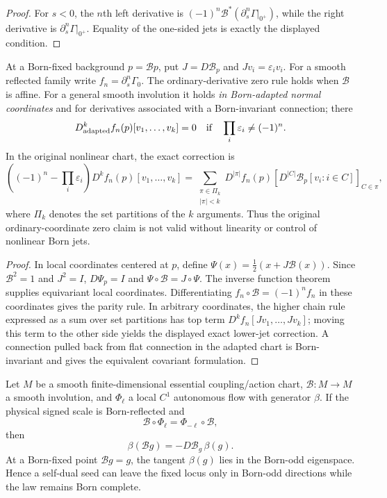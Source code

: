 \documentclass[12pt,a4paper]{article}
\begin{document}
\begin{proof}
For $s<0$, the $n$th left derivative is
$(-1)^n\mathcal B^*(\partial_s^n\Gamma|_{0^+})$, while the right derivative
is $\partial_s^n\Gamma|_{0^+}$.  Equality of the one-sided jets is exactly the
displayed condition.
\end{proof}

\begin{corollary}
\label{p12:cor:born-scale-field-parity-selection}
At a Born-fixed background $p=\mathcal Bp$, put
$J=D\mathcal B_p$ and $Jv_i=\varepsilon_i v_i$.
For a smooth reflected family write $f_n=\partial_s^n\Gamma_0$.
The ordinary-derivative zero rule holds when $\mathcal B$ is affine.
For a general smooth involution it holds \emph{in Born-adapted normal
coordinates} and for derivatives associated with a Born-invariant
connection; there
\[
 D^k_{\rm adapted}f_n(p)[v_1,\ldots,v_k]=0
 \quad\hbox{if}\quad\prod_i\varepsilon_i\ne(-1)^n.
\]
In the original nonlinear chart, the exact correction is
\[
 \left((-1)^n-\prod_i\varepsilon_i\right)
 D^kf_n(p)[v_1,\ldots,v_k]
 =\sum_{\substack{\pi\in\Pi_k\\|\pi|<k}}
 D^{|\pi|}f_n(p)
 \left[D^{|C|}\mathcal B_p[v_i:i\in C]\right]_{C\in\pi},
\]
where $\Pi_k$ denotes the set partitions of the $k$ arguments.
Thus the original ordinary-coordinate zero claim is not valid
without linearity or control of nonlinear Born jets.
\end{corollary}
\begin{proof}
In local coordinates centered at $p$, define
$\Psi(x)=\frac12(x+J\mathcal B(x))$. Since
$\mathcal B^2=1$ and $J^2=I$,
$D\Psi_p=I$ and $\Psi\circ\mathcal B=J\circ\Psi$.
The inverse function theorem supplies equivariant local coordinates.
Differentiating $f_n\circ\mathcal B=(-1)^nf_n$ in these coordinates
gives the parity rule. In arbitrary coordinates, the higher chain
rule expressed as a sum over set partitions has top term
$D^kf_n[Jv_1,\ldots,Jv_k]$; moving this term to the other side yields
the displayed exact lower-jet correction.
A connection pulled back from flat connection in the adapted chart
is Born-invariant and gives the equivalent covariant formulation.
\end{proof}


\begin{theorem}
\label{p12:thm:born-antiequivariant-beta}
Let $M$ be a smooth finite-dimensional essential coupling/action chart,
$\mathcal B:M\to M$ a smooth involution, and $\Phi_\ell$ a local $C^1$
autonomous flow with generator $\beta$.  If the physical signed scale is
Born-reflected and
\[
 \boxed{\mathcal B\circ\Phi_\ell=\Phi_{-\ell}\circ\mathcal B,}
\]
then
\[
 \boxed{\beta(\mathcal Bg)=-D\mathcal B_g\,\beta(g).}
\]
At a Born-fixed point $\mathcal Bg=g$, the tangent $\beta(g)$ lies in the
Born-odd eigenspace.  Hence a self-dual seed can leave the fixed locus only in
Born-odd directions while the law remains Born complete.
\end{theorem}
\end{document}
